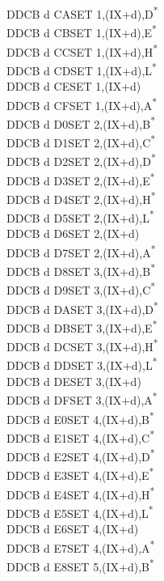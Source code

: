 \documentclass[twoside,openright,a4paper]{book}
\begin{document}
\begin{multicols}{3}
{\begin{tabbing}
	DDCB d CA\>SET 1,(IX+d),D\textsuperscript{*}\\
	DDCB d CB\>SET 1,(IX+d),E\textsuperscript{*}\\
	DDCB d CC\>SET 1,(IX+d),H\textsuperscript{*}\\
	DDCB d CD\>SET 1,(IX+d),L\textsuperscript{*}\\
	DDCB d CE\>SET 1,(IX+d)\\
	DDCB d CF\>SET 1,(IX+d),A\textsuperscript{*}\\
	DDCB d D0\>SET 2,(IX+d),B\textsuperscript{*}\\
	DDCB d D1\>SET 2,(IX+d),C\textsuperscript{*}\\
	DDCB d D2\>SET 2,(IX+d),D\textsuperscript{*}\\
	DDCB d D3\>SET 2,(IX+d),E\textsuperscript{*}\\
	DDCB d D4\>SET 2,(IX+d),H\textsuperscript{*}\\
	DDCB d D5\>SET 2,(IX+d),L\textsuperscript{*}\\
	DDCB d D6\>SET 2,(IX+d)\\
	DDCB d D7\>SET 2,(IX+d),A\textsuperscript{*}\\
	DDCB d D8\>SET 3,(IX+d),B\textsuperscript{*}\\
	DDCB d D9\>SET 3,(IX+d),C\textsuperscript{*}\\
	DDCB d DA\>SET 3,(IX+d),D\textsuperscript{*}\\
	DDCB d DB\>SET 3,(IX+d),E\textsuperscript{*}\\
	DDCB d DC\>SET 3,(IX+d),H\textsuperscript{*}\\
	DDCB d DD\>SET 3,(IX+d),L\textsuperscript{*}\\
	DDCB d DE\>SET 3,(IX+d)\\
	DDCB d DF\>SET 3,(IX+d),A\textsuperscript{*}\\
	DDCB d E0\>SET 4,(IX+d),B\textsuperscript{*}\\
	DDCB d E1\>SET 4,(IX+d),C\textsuperscript{*}\\
	DDCB d E2\>SET 4,(IX+d),D\textsuperscript{*}\\
	DDCB d E3\>SET 4,(IX+d),E\textsuperscript{*}\\
	DDCB d E4\>SET 4,(IX+d),H\textsuperscript{*}\\
	DDCB d E5\>SET 4,(IX+d),L\textsuperscript{*}\\
	DDCB d E6\>SET 4,(IX+d)\\
	DDCB d E7\>SET 4,(IX+d),A\textsuperscript{*}\\
	DDCB d E8\>SET 5,(IX+d),B\textsuperscript{*}\\

\end{tabbing}}
\end{multicols}
\end{document}
